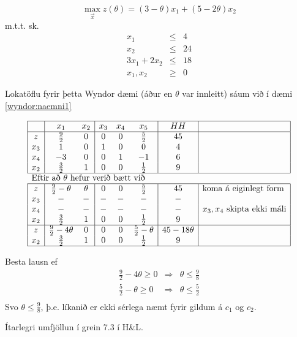 \begin{daemi}
$$ \max_{\vec{x}} z(\theta)=(3-\theta)x_1+(5-2\theta)x_2$$
m.t.t. sk.
\begin{eqnarray*}
 x_1 &\leq& 4\\
x_2 &\leq& 24\\
3x_1+2x_2&\leq&18\\
x_1,x_2 &\geq&0
\end{eqnarray*}
\end{daemi}
\begin{lausn}Lokatöflu fyrir þetta Wyndor dæmi (áður en $\theta$ var innleitt) sáum við í dæmi \ref{wyndor:naemni1}
 \begin{center}
{\renewcommand{\arraystretch}{1.5} \renewcommand{\tabcolsep}{0.2cm}
{\scriptsize
\[\begin{array}{|c|cc|ccc|c|l|} \hline
  &  x_1 &  x_2 & x_3 & x_4 & x_5 &  HH  &\\ \hline
 z &  \frac{9}{2} & 0 & 0 & 0 & \frac{5}{2}& 45 &\\
 x_3 &    1 & 0 & 1 & 0 & 0   & 4 &\\
 x_4 &   -3 & 0 & 0 & 1 &-1   & 6 &\\
 x_2 &  \frac{3}{2} & 1 & 0 & 0 & \frac{1}{2} & 9 &\\ \hline
\multicolumn{7}{l}{\mbox{Eftir að }\theta\mbox{ hefur verið bætt við}} \\ \hline
 z &  \frac{9}{2}-\theta & \theta & 0 & 0 & \frac{5}{2}& 45 & \mbox{koma á eiginlegt form}\\
 x_3 &    - & - &- & - & -   & - & \mbox{}\\
 x_4 &   - & - & -  & - & -   & - & x_3,x_4\mbox{ skipta ekki máli}\\
 x_2 &  \frac{3}{2} & 1 & 0 & 0 & \frac{1}{2} & 9 &\\ \hline
 z &  \frac{9}{2}-4\theta & 0 & 0 & 0 & \frac{5}{2}-\theta& 45-18\theta & \\
 x_2 &  \frac{3}{2} & 1 & 0 & 0 & \frac{1}{2} & 9 &\\ \hline
\end{array}\]
}}\end{center}
Besta lausn ef
\begin{eqnarray*}
\frac{9}{2}-4\theta\geq0&\Rightarrow &\theta\leq \frac{9}{8}\\
\frac{5}{2}-\theta\geq0&\Rightarrow &\theta\leq \frac{5}{2}\\
\end{eqnarray*}
Svo $\theta\leq \frac{9}{8}$, þ.e. líkanið er ekki sérlega næmt fyrir gildum á $c_1$ og $c_2$.
\begin{aths}Ítarlegri umfjöllun í grein 7.3 í H\&L.\end{aths}

\end{lausn}
